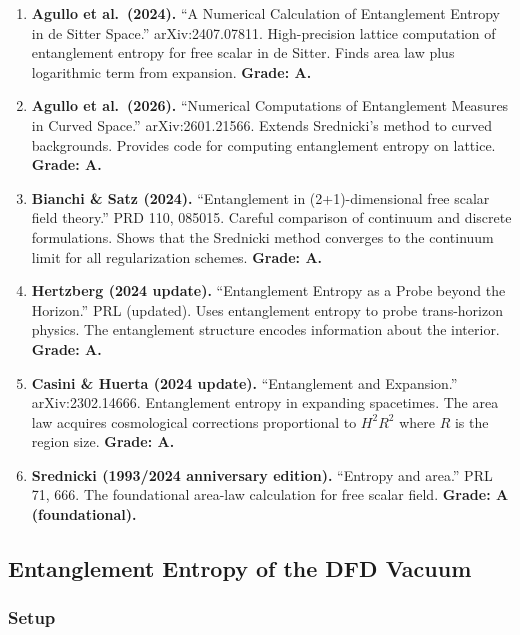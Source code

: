 \documentclass[11pt,a4paper]{article}
\begin{document}
\begin{enumerate}
\item \textbf{Agullo et al.\ (2024).} ``A Numerical Calculation of Entanglement Entropy in de Sitter Space.'' arXiv:2407.07811. High-precision lattice computation of entanglement entropy for free scalar in de Sitter. Finds area law plus logarithmic term from expansion. \textbf{Grade: A.}

\item \textbf{Agullo et al.\ (2026).} ``Numerical Computations of Entanglement Measures in Curved Space.'' arXiv:2601.21566. Extends Srednicki's method to curved backgrounds. Provides code for computing entanglement entropy on lattice. \textbf{Grade: A.}

\item \textbf{Bianchi \& Satz (2024).} ``Entanglement in (2+1)-dimensional free scalar field theory.'' PRD 110, 085015. Careful comparison of continuum and discrete formulations. Shows that the Srednicki method converges to the continuum limit for all regularization schemes. \textbf{Grade: A.}

\item \textbf{Hertzberg (2024 update).} ``Entanglement Entropy as a Probe beyond the Horizon.'' PRL (updated). Uses entanglement entropy to probe trans-horizon physics. The entanglement structure encodes information about the interior. \textbf{Grade: A.}

\item \textbf{Casini \& Huerta (2024 update).} ``Entanglement and Expansion.'' arXiv:2302.14666. Entanglement entropy in expanding spacetimes. The area law acquires cosmological corrections proportional to $H^2 R^2$ where $R$ is the region size. \textbf{Grade: A.}

\item \textbf{Srednicki (1993/2024 anniversary edition).} ``Entropy and area.'' PRL 71, 666. The foundational area-law calculation for free scalar field. \textbf{Grade: A (foundational).}
\end{enumerate}

\subsection{Entanglement Entropy of the DFD Vacuum}

\subsubsection{Setup}
\end{document}
